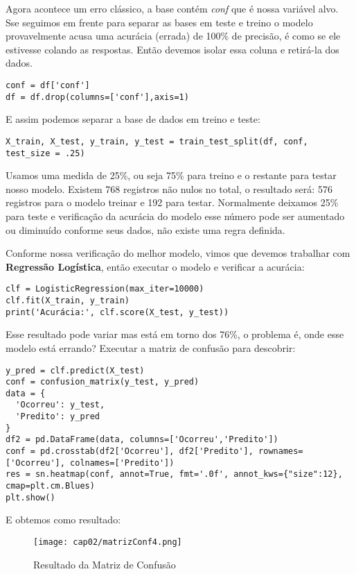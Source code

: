 Agora acontece um erro clássico, a base contém \textit{conf} que é nossa variável alvo. Sse seguimos em frente para separar as bases em teste e treino o modelo provavelmente acusa uma acurácia (errada) de 100\% de precisão, é como se ele estivesse colando as respostas. Então devemos isolar essa coluna e retirá-la dos dados. 
\begin{lstlisting}
conf = df['conf']
df = df.drop(columns=['conf'],axis=1)
\end{lstlisting}

E assim podemos separar a base de dados em treino e teste:
\begin{lstlisting}
X_train, X_test, y_train, y_test = train_test_split(df, conf, test_size = .25)
\end{lstlisting}

Usamos uma medida de 25\%, ou seja 75\% para treino e o restante para testar nosso modelo. Existem 768 registros não nulos no total, o resultado será: 576 registros para o modelo treinar e 192 para testar. Normalmente deixamos 25\% para teste e verificação da acurácia do modelo esse número pode ser aumentado ou diminuído conforme seus dados, não existe uma regra definida.

Conforme nossa verificação do melhor modelo, vimos que devemos trabalhar com \textbf{Regressão Logística}, então executar o modelo e verificar a acurácia:
\begin{lstlisting}
clf = LogisticRegression(max_iter=10000)
clf.fit(X_train, y_train)
print('Acurácia:', clf.score(X_test, y_test))
\end{lstlisting}

Esse resultado pode variar mas está em torno dos 76\%, o problema é, onde esse modelo está errando? Executar a matriz de confusão para descobrir:
\begin{lstlisting}
y_pred = clf.predict(X_test)
conf = confusion_matrix(y_test, y_pred)
data = {
  'Ocorreu': y_test,
  'Predito': y_pred
}
df2 = pd.DataFrame(data, columns=['Ocorreu','Predito'])
conf = pd.crosstab(df2['Ocorreu'], df2['Predito'], rownames=['Ocorreu'], colnames=['Predito'])
res = sn.heatmap(conf, annot=True, fmt='.0f', annot_kws={"size":12}, cmap=plt.cm.Blues)
plt.show()
\end{lstlisting}

E obtemos como resultado:
\begin{figure}[H]
	\centering
	\texttt{[image: cap02/matrizConf4.png]}
	\caption{Resultado da Matriz de Confusão}
\end{figure}

